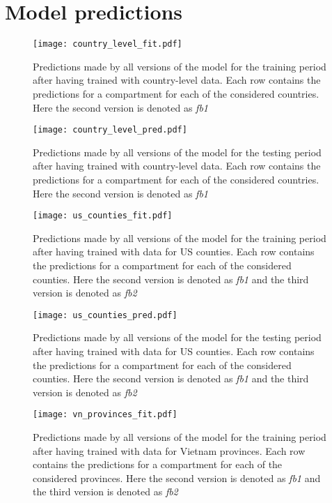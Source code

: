 \appendix

\chapter{Model predictions}

\begin{figure}[!htb]
    \centering
    \texttt{[image: country\_level\_fit.pdf]}
    \caption{Predictions made by all versions of the model for the training period after having trained with country-level data. Each row contains the predictions for a compartment for each of the considered countries. Here the second version is denoted as \textit{fb1}}
    \label{fig:fit-country-level}
\end{figure}

\begin{figure}[!htb]
    \centering
    \texttt{[image: country\_level\_pred.pdf]}
    \caption{Predictions made by all versions of the model for the testing period after having trained with country-level data. Each row contains the predictions for a compartment for each of the considered countries. Here the second version is denoted as \textit{fb1}}
    \label{fig:pred-country-level}
\end{figure}

\begin{figure}[!htb]
    \centering
    \texttt{[image: us\_counties\_fit.pdf]}
    \caption{Predictions made by all versions of the model for the training period after having trained with data for \gls{US} counties. Each row contains the predictions for a compartment for each of the considered counties. Here the second version is denoted as \textit{fb1} and the third version is denoted as \textit{fb2}}
    \label{fig:fit-us-counties}
\end{figure}

\begin{figure}[!htb]
    \centering
    \texttt{[image: us\_counties\_pred.pdf]}
    \caption{Predictions made by all versions of the model for the testing period after having trained with data for \gls{US} counties. Each row contains the predictions for a compartment for each of the considered counties. Here the second version is denoted as \textit{fb1} and the third version is denoted as \textit{fb2}}
    \label{fig:pred-us-counties}
\end{figure}

\begin{figure}[!htb]
    \centering
    \texttt{[image: vn\_provinces\_fit.pdf]}
    \caption{Predictions made by all versions of the model for the training period after having trained with data for Vietnam provinces. Each row contains the predictions for a compartment for each of the considered provinces. Here the second version is denoted as \textit{fb1} and the third version is denoted as \textit{fb2}}
    \label{fig:fit-vn-provinces}
\end{figure}

